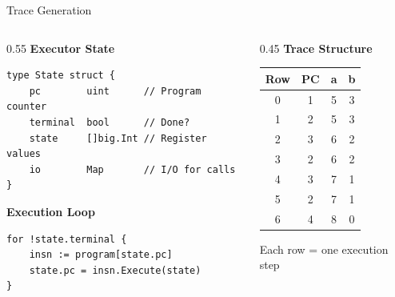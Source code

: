 \documentclass[aspectratio=169,11pt]{beamer}
\begin{document}
\begin{frame}[fragile]{Trace Generation}

\begin{columns}
\begin{column}{0.55\textwidth}
\textbf{Executor State}
\begin{lstlisting}[style=golang]
type State struct {
    pc        uint      // Program counter
    terminal  bool      // Done?
    state     []big.Int // Register values
    io        Map       // I/O for calls
}
\end{lstlisting}

\vspace{0.5em}
\textbf{Execution Loop}
\begin{lstlisting}[style=golang]
for !state.terminal {
    insn := program[state.pc]
    state.pc = insn.Execute(state)
}
\end{lstlisting}
\end{column}

\begin{column}{0.45\textwidth}
\textbf{Trace Structure}

\begin{table}
\centering
\scriptsize
\begin{tabular}{cccc}
\toprule
Row & PC & a & b \\
\midrule
0 & 1 & 5 & 3 \\
1 & 2 & 5 & 3 \\
2 & 3 & 6 & 2 \\
3 & 2 & 6 & 2 \\
4 & 3 & 7 & 1 \\
5 & 2 & 7 & 1 \\
6 & 4 & 8 & 0 \\
\bottomrule
\end{tabular}
\end{table}

Each row = one execution step
\end{column}
\end{columns}
\end{frame}
\end{document}
